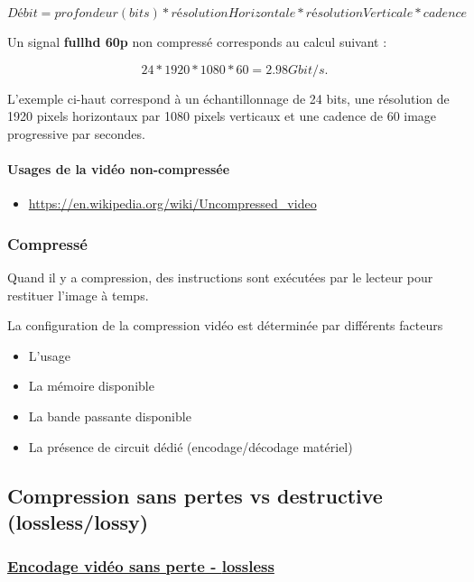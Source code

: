 \documentclass[
  french,
]{book}
\providecommand{\tightlist}{%
  \setlength{\itemsep}{0pt}\setlength{\parskip}{0pt}}
\begin{document}
\[
Débit = profondeur(bits)  * résolutionHorizontale * résolutionVerticale * cadence
\]

Un signal \textbf{fullhd 60p} non compressé corresponds au calcul suivant :

\[
24 * 1920 * 1080 * 60 = 2.98 Gbit/s.
\]

L'exemple ci-haut correspond à un échantillonnage de 24 bits, une résolution de 1920 pixels horizontaux par 1080 pixels verticaux et une cadence de 60 image progressive par secondes.

\hypertarget{usages-de-la-viduxe9o-non-compressuxe9e}{%
\paragraph{Usages de la vidéo non-compressée}\label{usages-de-la-viduxe9o-non-compressuxe9e}}

\begin{itemize}
\tightlist
\item
  \url{https://en.wikipedia.org/wiki/Uncompressed_video}
\end{itemize}

\hypertarget{compressuxe9}{%
\subsubsection{Compressé}\label{compressuxe9}}

Quand il y a compression, des instructions sont exécutées par le lecteur pour restituer l'image à temps.

La configuration de la compression vidéo est déterminée par différents facteurs

\begin{itemize}
\tightlist
\item
  L'usage
\item
  La mémoire disponible
\item
  La bande passante disponible
\item
  La présence de circuit dédié (encodage/décodage matériel)
\end{itemize}

\hypertarget{compression-sans-pertes-vs-destructive-losslesslossy}{%
\subsection{Compression sans pertes vs destructive (lossless/lossy)}\label{compression-sans-pertes-vs-destructive-losslesslossy}}

\hypertarget{encodage-viduxe9o-sans-perte---lossless}{%
\subsubsection{\texorpdfstring{\href{https://en.wikipedia.org/wiki/List_of_codecs\#Lossless_video_compression}{Encodage vidéo sans perte - \textbf{lossless}}}{Encodage vidéo sans perte - lossless}}\label{encodage-viduxe9o-sans-perte---lossless}}
\end{document}
